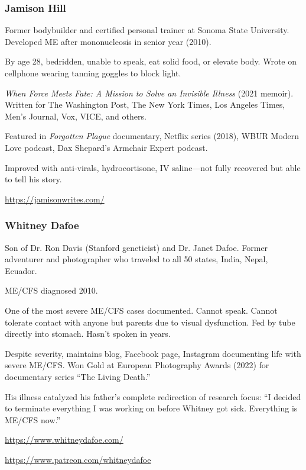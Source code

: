 \subsubsection{Jamison Hill}
\begin{description}[style=sameline]
\item[Background] Former bodybuilder and certified personal trainer at Sonoma State University. Developed ME after mononucleosis in senior year (2010).
\item[Illness severity] By age 28, bedridden, unable to speak, eat solid food, or elevate body. Wrote on cellphone wearing tanning goggles to block light.
\item[Publications] \textit{When Force Meets Fate: A Mission to Solve an Invisible Illness} (2021 memoir). Written for The Washington Post, The New York Times, Los Angeles Times, Men's Journal, Vox, VICE, and others.
\item[Media] Featured in \textit{Forgotten Plague} documentary, Netflix series (2018), WBUR Modern Love podcast, Dax Shepard's Armchair Expert podcast.
\item[Current status] Improved with anti-virals, hydrocortisone, IV saline---not fully recovered but able to tell his story.
\item[Website] \url{https://jamisonwrites.com/}
\end{description}

\subsubsection{Whitney Dafoe}
\begin{description}[style=sameline]
\item[Background] Son of Dr. Ron Davis (Stanford geneticist) and Dr. Janet Dafoe. Former adventurer and photographer who traveled to all 50 states, India, Nepal, Ecuador.
\item[Diagnosis] ME/CFS diagnosed 2010.
\item[Current severity] One of the most severe ME/CFS cases documented. Cannot speak. Cannot tolerate contact with anyone but parents due to visual dysfunction. Fed by tube directly into stomach. Hasn't spoken in years.
\item[Advocacy] Despite severity, maintains blog, Facebook page, Instagram documenting life with severe ME/CFS. Won Gold at European Photography Awards (2022) for documentary series ``The Living Death.''
\item[Impact] His illness catalyzed his father's complete redirection of research focus: ``I decided to terminate everything I was working on before Whitney got sick. Everything is ME/CFS now.''
\item[Website] \url{https://www.whitneydafoe.com/}
\item[Patreon] \url{https://www.patreon.com/whitneydafoe}
\end{description}

